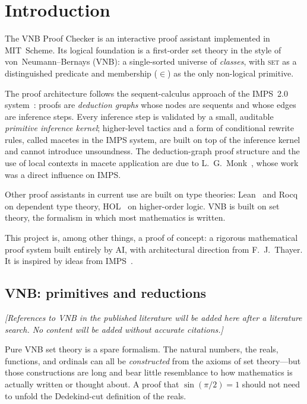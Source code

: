 \chapter{Introduction}

\begin{sloppypar}The VNB Proof Checker is an interactive proof assistant implemented in
MIT~Scheme.  Its logical foundation is a first-order set theory in the
style of von~Neumann--Bernays (VNB): a single-sorted universe of
\emph{classes}, with \textsc{set} as a distinguished predicate and
membership ($\in$) as the only non-logical primitive.\end{sloppypar}

The proof architecture follows the sequent-calculus approach of the
IMPS~2.0 system~\cite{IMPS}: proofs are \emph{deduction graphs} whose
nodes are sequents and whose edges are inference steps.  Every
inference step is validated by a small, auditable \emph{primitive
inference kernel}; higher-level tactics and a form of conditional
rewrite rules, called macetes in the IMPS system, are built on top of
the inference kernel and cannot introduce unsoundness.
The deduction-graph proof structure and the use of local contexts in
macete application are due to L.~G.~Monk~\cite{Monk1988}, whose work
was a direct influence on IMPS.

Other proof assistants in current use are built on type theories:
Lean~\cite{Lean} and Rocq~\cite{Rocq} on dependent type theory,
HOL~\cite{HOL} on higher-order logic.  VNB is built on set theory, the
formalism in which most mathematics is written.

This project is, among other things, a proof of concept: a rigorous
mathematical proof system built entirely by AI,
with architectural direction from F.~J.~Thayer.  It is inspired by
ideas from IMPS~\cite{IMPS}.

\section{VNB: primitives and reductions}
\label{sec:primitives}

\emph{[References to VNB in the published literature will be added here
after a literature search.  No content will be added without accurate
citations.]}

Pure VNB set theory is a spare formalism.  The natural numbers, the
reals, functions, and ordinals can all be \emph{constructed} from the
axioms of set theory---but those constructions are long and bear little
resemblance to how mathematics is actually written or thought
about.  A proof that $\sin(\pi/2) = 1$ should not need to unfold the
Dedekind-cut definition of the reals.

